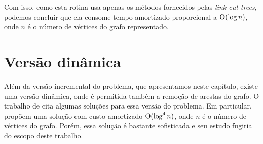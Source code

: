 Com isso, como esta rotina usa apenas os métodos fornecidos pelas \emph{link-cut trees}, podemos concluir que ela consome tempo amortizado proporcional a $\mathrm{O}(\log n)$, onde $n$ é o número de vértices do grafo representado.

\section{Versão dinâmica}
\label{sec:versao-dinamica}

Além da versão incremental do problema, que apresentamos neste capítulo, existe uma versão dinâmica, onde é permitida também a remoção de arestas do grafo. O trabalho de \citet{hanauer2021recent} cita algumas soluções para essa versão do problema. Em particular, \citet{10.1145/502090.502095} propõem uma solução com custo amortizado $\mathrm{O}(\log^4 n)$, onde $n$ é o número de vértices do grafo. Porém, essa solução é bastante sofisticada e seu estudo fugiria do escopo deste trabalho.